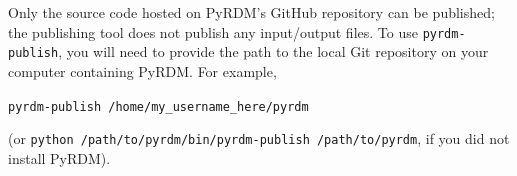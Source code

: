 \documentclass[a4paper,11pt]{report}
\begin{document}
Only the source code hosted on PyRDM's GitHub repository can be published; the publishing tool does not publish any input/output files. To use \texttt{pyrdm-publish}, you will need to provide the path to the local Git repository on your computer containing PyRDM. For example,

\texttt{pyrdm-publish /home/my\_username\_here/pyrdm}

(or \texttt{python /path/to/pyrdm/bin/pyrdm-publish /path/to/pyrdm}, if you did not install PyRDM).
\end{document}
